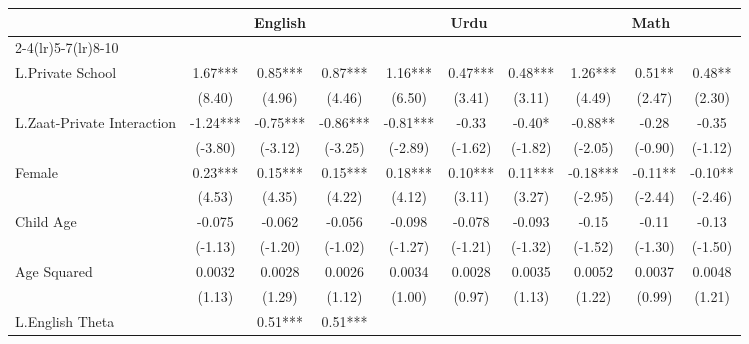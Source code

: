 \begin{sidewaystable}[htbp]\centering
\def\sym#1{\ifmmode^{#1}\else\(^{#1}\)\fi}
\caption{Scores at Class 4\label{wlags}}
\begin{tabular}{l*{9}{c}}
\toprule
                &\multicolumn{3}{c}{English}           &\multicolumn{3}{c}{Urdu}              &\multicolumn{3}{c}{Math}              \\\cmidrule(lr){2-4}\cmidrule(lr){5-7}\cmidrule(lr){8-10}
                &\multicolumn{1}{c}{}&\multicolumn{1}{c}{}&\multicolumn{1}{c}{}&\multicolumn{1}{c}{}&\multicolumn{1}{c}{}&\multicolumn{1}{c}{}&\multicolumn{1}{c}{}&\multicolumn{1}{c}{}&\multicolumn{1}{c}{}\\
\midrule
L.Private School&     1.67***&     0.85***&     0.87***&     1.16***&     0.47***&     0.48***&     1.26***&     0.51** &     0.48** \\
                &   (8.40)   &   (4.96)   &   (4.46)   &   (6.50)   &   (3.41)   &   (3.11)   &   (4.49)   &   (2.47)   &   (2.30)   \\
L.Zaat-Private Interaction&    -1.24***&    -0.75***&    -0.86***&    -0.81***&    -0.33   &    -0.40*  &    -0.88** &    -0.28   &    -0.35   \\
                &  (-3.80)   &  (-3.12)   &  (-3.25)   &  (-2.89)   &  (-1.62)   &  (-1.82)   &  (-2.05)   &  (-0.90)   &  (-1.12)   \\
Female          &     0.23***&     0.15***&     0.15***&     0.18***&     0.10***&     0.11***&    -0.18***&    -0.11** &    -0.10** \\
                &   (4.53)   &   (4.35)   &   (4.22)   &   (4.12)   &   (3.11)   &   (3.27)   &  (-2.95)   &  (-2.44)   &  (-2.46)   \\
Child Age       &   -0.075   &   -0.062   &   -0.056   &   -0.098   &   -0.078   &   -0.093   &    -0.15   &    -0.11   &    -0.13   \\
                &  (-1.13)   &  (-1.20)   &  (-1.02)   &  (-1.27)   &  (-1.21)   &  (-1.32)   &  (-1.52)   &  (-1.30)   &  (-1.50)   \\
Age Squared     &   0.0032   &   0.0028   &   0.0026   &   0.0034   &   0.0028   &   0.0035   &   0.0052   &   0.0037   &   0.0048   \\
                &   (1.13)   &   (1.29)   &   (1.12)   &   (1.00)   &   (0.97)   &   (1.13)   &   (1.22)   &   (0.99)   &   (1.21)   \\
L.English Theta &            &     0.51***&     0.51***&            &            &            &            &            &            \\

\end{tabular}
\end{sidewaystable}
